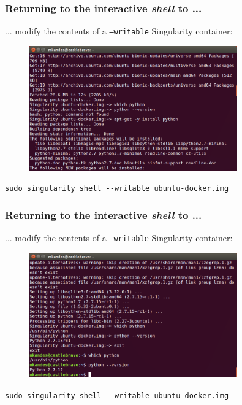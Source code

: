 \documentclass{beamer}
\begin{document}
\begin{frame}
   \frametitle{Returning to the interactive \textit{shell} to ... }
   ... modify the contents of a \texttt{--writable} Singularity container:
   \begin{figure}[htbp]
      \includegraphics[width=0.8\textwidth]{images/singularity-shell-writable-apt-get-install-python-start.png}
   \end{figure}
   \lstinline{sudo singularity shell --writable ubuntu-docker.img}
\end{frame}

\begin{frame}
   \frametitle{Returning to the interactive \textit{shell} to ... }
   ... modify the contents of a \texttt{--writable} Singularity container:
   \begin{figure}[htbp]
      \includegraphics[width=0.8\textwidth]{images/singularity-shell-writable-apt-get-install-python-end.png}
   \end{figure}
   \lstinline{sudo singularity shell --writable ubuntu-docker.img}
\end{frame}
\end{document}
